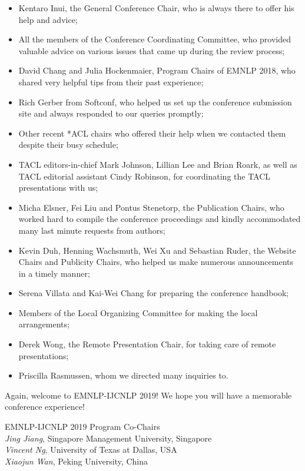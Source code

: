 \begin{itemize}
   \item Kentaro Inui, the General Conference Chair, who is always there to offer his help and advice;
   \item All the members of the Conference Coordinating Committee, who provided valuable advice on various issues that came up during the review process;
   \item David Chang and Julia Hockenmaier, Program Chairs of EMNLP 2018, who shared very helpful tips from their past experience;
   \item Rich Gerber from Softconf, who helped us set up the conference submission site and always responded to our queries promptly;
   \item Other recent *ACL chairs who offered their help when we contacted them despite their busy schedule;
   \item TACL editors-in-chief Mark Johnson, Lillian Lee and Brian Roark, as well as TACL editorial assistant Cindy Robinson, for coordinating the TACL presentations with us;
   \item Micha Elsner, Fei Liu and Pontus Stenetorp, the Publication Chairs, who worked hard to compile the conference proceedings and kindly accommodated many last minute requests from authors;
   \item Kevin Duh, Henning Wachsmuth, Wei Xu and Sebastian Ruder, the Website Chairs and Publicity Chairs, who helped us make numerous announcements in a timely manner;
   \item Serena Villata and Kai-Wei Chang for preparing the conference handbook;
   \item Members of the Local Organizing Committee for making the local arrangements;
   \item Derek Wong, the Remote Presentation Chair, for taking care of remote presentations;
   \item Priscilla Rasmussen, whom we directed many inquiries to.
\end{itemize}

Again, welcome to EMNLP-IJCNLP 2019! We hope you will have a memorable conference experience!

\vspace{3em}

\noindent EMNLP-IJCNLP 2019 Program Co-Chairs \\

\noindent \textit{Jing Jiang}, Singapore Management University, Singapore \\
\noindent \textit{Vincent Ng}, University of Texas at Dallas, USA\\
\noindent \textit{Xiaojun Wan}, Peking University, China

